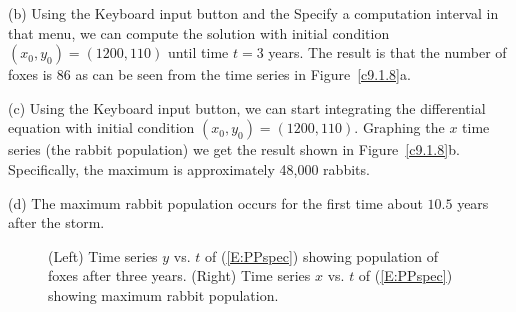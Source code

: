 \documentclass{ximera}
\begin{document}
\begin{computerExercise}
\begin{solution}
\noindent (b) Using the {\sf Keyboard input} button and the {\sf Specify a
computation interval} in that menu, we can compute the solution with initial
condition $(x_0,y_0)=(1200,110)$ until time $t=3$ years.  The result is that
the number of foxes is $86$ as can be seen from the time series in 
Figure~\ref{c9.1.8}a.

\noindent (c)  Using the {\sf Keyboard input} button, we can start
integrating the differential equation with initial condition
$(x_0,y_0)=(1200,110)$.  Graphing the $x$ time series (the rabbit population)
we get the result shown in Figure~\ref{c9.1.8}b.  Specifically, the 
maximum is approximately 48,000 rabbits. 

\noindent (d)  The maximum rabbit population occurs for the first time about 
$10.5$ years after the storm.

\begin{figure}[htb]
     \centerline{%
     }
     \caption{(Left) Time series $y$ vs. $t$ of (\protect\ref{E:PPspec}) 
	showing population of foxes after three years. (Right) Time series $x$ 
	vs. $t$ of (\protect\ref{E:PPspec}) showing maximum rabbit population.}
\end{figure}


\end{solution}
\end{computerExercise}
\end{document}
